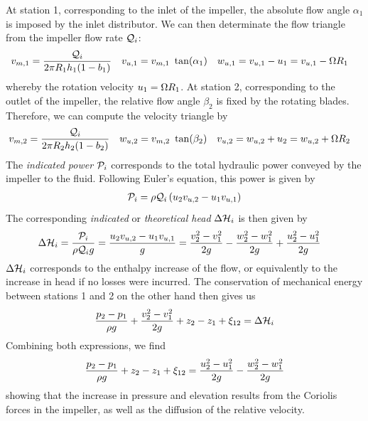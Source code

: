At station 1, corresponding to the inlet of the impeller, the absolute
flow angle $\alpha_1$ is imposed by the inlet distributor. We can then
determinate the flow triangle from the impeller flow rate $\mathcal Q_i$:
\begin{align*}
  v_{m,1} &= \frac{\mathcal Q_i}{2 \pi R_1 h_1 (1-b_1)} &
  v_{u,1} &= v_{m,1}~\tan(\alpha_1) &
  w_{u,1} &= v_{u,1} - u_1 = v_{u,1} - \Omega R_1
\end{align*}
whereby the rotation velocity $u_1 = \Omega R_1$. At station 2,
corresponding to the outlet of the impeller, the relative flow angle
$\beta_2$ is fixed by the rotating blades. Therefore, we can compute
the velocity triangle by
\begin{align*}
  v_{m,2} &= \frac{\mathcal Q_i}{2 \pi R_2 h_2 (1-b_2)} &
  w_{u,2} &= v_{m,2}~\tan(\beta_2) &
  v_{u,2} &= w_{u,2} + u_2 = w_{u,2} + \Omega R_2
\end{align*}
The \emph{indicated power} $\mathcal P_i$ corresponds to the total
hydraulic power conveyed by the impeller to the fluid. Following
Euler's equation, this power is given by
\begin{align*}
  \mathcal P_i = \rho \mathcal Q_i \left(u_2 v_{u,2} - u_1 v_{u,1}\right)
\end{align*}
The corresponding \emph{indicated} or \emph{theoretical head}
$\Delta \mathcal H_i$ is then given by
\begin{align*}
  \Delta \mathcal H_i &= \frac{\mathcal P_i}{\rho \mathcal Q_i g} 
  = \frac{u_2 v_{u,2} - u_1 v_{u,1}}{g} 
  = 
  \frac{v_2^2 - v_1^2}{2g} - 
  \frac{w_2^2 - w_1^2}{2g} + 
  \frac{u_2^2 - u_1^2}{2g}
\end{align*}
$\Delta \mathcal H_i$ corresponds to the enthalpy increase of the flow, or
equivalently to the increase in head if no losses were incurred. The
conservation of mechanical energy between stations 1 and 2 on the
other hand then gives us
\begin{align*}
  \frac{p_2 - p_1}{\rho g} + 
  \frac{v_2^2 -  v_1^2}{2g} + 
  z_2 - z_1 + \xi_{12} = \Delta \mathcal H_i
\end{align*}
Combining both expressions, we find
\begin{align*}
  \frac{p_2 - p_1}{\rho g} + z_2 - z_1 + \xi_{12} =
  \frac{u_2^2 - u_1^2}{2g} - \frac{w_2^2 - w_1^2}{2g}
\end{align*}
showing that the increase in pressure and elevation results from the
Coriolis forces in the impeller, as well as the diffusion of the
relative velocity.

